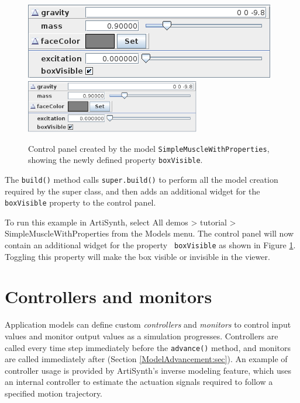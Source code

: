 \begin{figure}[t]
\begin{center}
\iflatexml
 \includegraphics[]{images/boxVisiblePanel}
\else
 \includegraphics[width=3in]{images/boxVisiblePanel}
\fi
\end{center}
\caption{Control panel created by the model {\tt SimpleMuscleWithProperties},
showing the newly defined property {\tt boxVisible}.}
\label{boxVisiblePanel:fig}
\end{figure}

The {\tt build()} method calls {\tt super.build()} to perform all the
model creation required by the super class, and then adds an
additional widget for the {\tt boxVisible} property to the control
panel.

To run this example in ArtiSynth, select {\sf All demos > tutorial >
SimpleMuscleWithProperties} from the {\sf Models} menu. The control
panel will now contain an additional widget for the property {\tt
boxVisible} as shown in Figure \ref{boxVisiblePanel:fig}. Toggling
this property will make the box visible or invisible in the viewer.


\section{Controllers and monitors}
\label{ControllersAndMonitors:sec}

Application models can define custom {\it controllers} and {\it
monitors} to control input values and monitor output values as a
simulation progresses. Controllers are called every time step
immediately before the {\tt advance()} method, and monitors are called
immediately after (Section \ref{ModelAdvancement:sec}).  An example of
controller usage is provided by ArtiSynth's inverse modeling feature,
which uses an internal controller to estimate the actuation signals
required to follow a specified motion trajectory.

